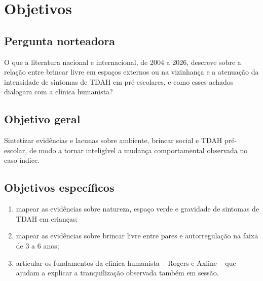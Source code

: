 \section{Objetivos}

\subsection{Pergunta norteadora}

O que a literatura nacional e internacional, de 2004 a 2026, descreve sobre a rela\c{c}\~ao entre brincar livre em espa\c{c}os externos ou na vizinhan\c{c}a e a atenua\c{c}\~ao da intensidade de sintomas de TDAH em pr\'e-escolares, e como esses achados dialogam com a cl\'inica humanista?

\subsection{Objetivo geral}

Sintetizar evid\^encias e lacunas sobre ambiente, brincar social e TDAH pr\'e-escolar, de modo a tornar intelig\'ivel a mudan\c{c}a comportamental observada no caso \'indice.

\subsection{Objetivos espec\'ificos}

\begin{enumerate}[label=\alph*),leftmargin=1.9cm]
  \item mapear as evid\^encias sobre natureza, espa\c{c}o verde e gravidade de sintomas de TDAH em crian\c{c}as;
  \item mapear as evid\^encias sobre brincar livre entre pares e autorregula\c{c}\~ao na faixa de 3 a 6 anos;
  \item articular os fundamentos da cl\'inica humanista -- Rogers e Axline -- que ajudam a explicar a tranquiliza\c{c}\~ao observada tamb\'em em sess\~ao.
\end{enumerate}
